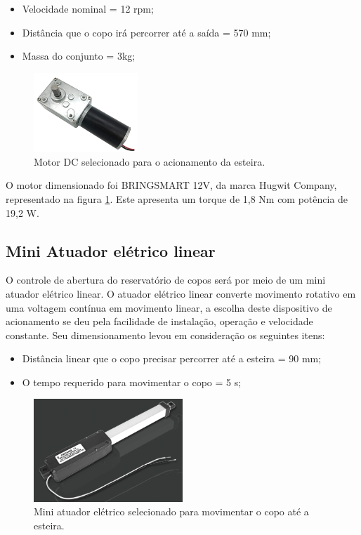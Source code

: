 \begin{itemize}
    \item Velocidade nominal = 12 rpm;
    \item Distância que o copo irá percorrer até a saída = 570 mm;
     \item Massa do conjunto = 3kg; 
\end{itemize}

\begin{figure}[H]
\centering
    \includegraphics[width=0.35\textwidth]{figuras/Energia_dc.PNG}
    \caption{Motor DC selecionado para o acionamento da esteira.}
    \label{fig:energia_dc}
\end{figure}

O motor dimensionado foi BRINGSMART 12V, da marca Hugwit Company, representado na figura \ref{fig:energia_dc}. Este apresenta um torque de 1,8 Nm com potência de 19,2 W. 
 
\subsection{Mini Atuador elétrico linear}\label{energ:atuador_linear}

O controle de abertura do reservatório de copos será por meio de um mini atuador elétrico linear. O atuador elétrico linear converte movimento rotativo em uma voltagem contínua em movimento linear, a escolha deste dispositivo de acionamento se deu pela facilidade de instalação, operação e velocidade constante. Seu dimensionamento levou em consideração os seguintes itens:

\begin{itemize}
    \item Distância linear que o copo precisar percorrer até a esteira = 90 mm;
    \item O tempo requerido para movimentar o copo = 5 s;
\end{itemize}

\begin{figure}[H]
\centering
    \includegraphics[width=0.5\textwidth]{figuras/Energia_atuador.PNG}
    \caption{Mini atuador elétrico selecionado para movimentar o copo até a esteira.}
    \label{fig:energia_atuador}
\end{figure}


